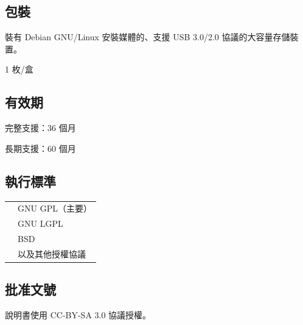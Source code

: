 \documentclass{article}
\begin{document}
\begin{multicols*}{3}
	\medskip


	\begin{tcolorbox}
	\section*{包裝}
	\end{tcolorbox}

	裝有 Debian GNU/Linux 安裝媒體的、支援 USB 3.0/2.0 協議的大容量存儲裝置。

	1 枚/盒

	\medskip


	\begin{tcolorbox}
	\section*{有效期}
	\end{tcolorbox}

	完整支援：36 個月

	長期支援：60 個月

	\medskip


	\begin{tcolorbox}
	\section*{執行標準}
	\end{tcolorbox}
	\begin{tabularx}{\linewidth}{@{}ll@{}}
		\multirow{4}{*}{}{開放原始碼許可：} & GNU GPL（主要）\\
		~ & GNU LGPL \\
		~ & BSD \\
		~ & 以及其他授權協議 \\
	\end{tabularx}

	\medskip


	\begin{tcolorbox}
	\section*{批准文號}
	\end{tcolorbox}

	說明書使用 CC-BY-SA 3.0 協議授權。

	\medskip




\end{multicols*}
\end{document}
